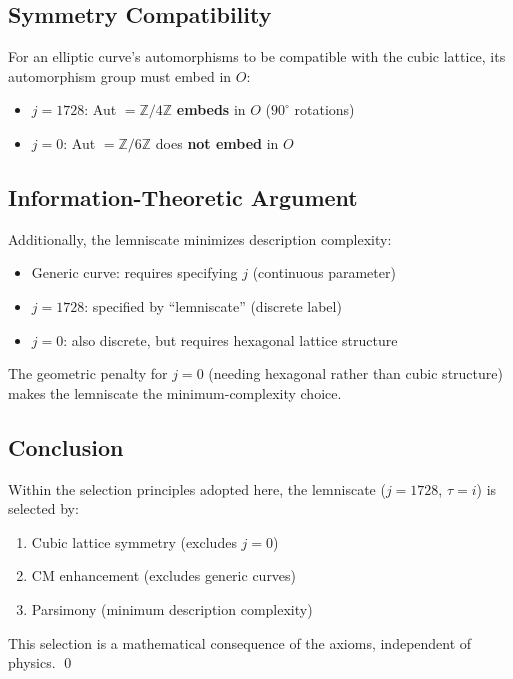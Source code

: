 \documentclass[11pt,a4paper]{article}
\theoremstyle{definition}
\theoremstyle{remark}
\begin{document}
\subsection*{Symmetry Compatibility}

For an elliptic curve's automorphisms to be compatible with the cubic lattice, its automorphism group must embed in $O$:
\begin{itemize}
    \item $j = 1728$: Aut $= \mathbb{Z}/4\mathbb{Z}$ \textbf{embeds} in $O$ ($90^\circ$ rotations)
    \item $j = 0$: Aut $= \mathbb{Z}/6\mathbb{Z}$ does \textbf{not embed} in $O$
\end{itemize}

\subsection*{Information-Theoretic Argument}

Additionally, the lemniscate minimizes description complexity:
\begin{itemize}
    \item Generic curve: requires specifying $j$ (continuous parameter)
    \item $j = 1728$: specified by ``lemniscate'' (discrete label)
    \item $j = 0$: also discrete, but requires hexagonal lattice structure
\end{itemize}

The geometric penalty for $j = 0$ (needing hexagonal rather than cubic structure) makes the lemniscate the minimum-complexity choice.

\subsection*{Conclusion}

Within the selection principles adopted here, the lemniscate ($j = 1728$, $\tau = i$) is selected by:
\begin{enumerate}
    \item Cubic lattice symmetry (excludes $j = 0$)
    \item CM enhancement (excludes generic curves)
    \item Parsimony (minimum description complexity)
\end{enumerate}

This selection is a mathematical consequence of the axioms, independent of physics. \qed
\end{document}
